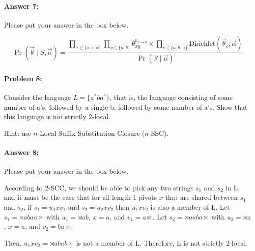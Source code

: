\documentclass[10pt]{article}
\newenvironment{AnswerBox}{\begin{mdframed}[style=simple]}{\end{mdframed}}
\begin{document}
\paragraph{Answer 7:}  Please put your answer in the box below.


\begin{AnswerBox}%

    \[\Pr(\vec{\theta} \mid S, \vec{\alpha}) = \frac{\prod_{x \in \{a, b, \rtimes\}} \prod_{y \in \{a, b\}} \theta_{xy}^{n_{x \rightarrow y}} \times \prod_{c \in \{a, b, \rtimes\}} \mathrm{Dirichlet}(\vec{\theta}_c; \vec{\alpha})}{\Pr(S \mid \vec{\alpha})}\]


    
\end{AnswerBox}%



\hrulefill %

\paragraph{Problem 8:}

Consider the language $L=\{a^* b a^*\}$, that is, the language
consisting of some number of a's, followed by a single b, followed by
some number of a's. Show that this language is not strictly
$2$-local.

 Hint: use $n$-Local Suffix Substitution Closure ($n$-SSC).

\paragraph{Answer 8:} Please put your answer in the box below.


\begin{AnswerBox}%

    According to 2-SCC, we should be able to pick any two strings $s_1$ and $s_2$ in L, and it must be the case that for all length 1 pivots $x$ that are shared between $s_1$ and $s_2$, if $s_1=u_1xv_1$ and $s_2=u_2xv_2$ then $u_1xv_2$ is also a member of L.
    Let $s_1 = \rtimes abaa \ltimes$ with $u_1 = \rtimes ab$, $x = a$, and $v_1 = a\ltimes$.
    Let $s_2 = \rtimes aaba \ltimes$ with $u_2 = \rtimes a$, $x = a$, and $v_2 = ba\ltimes$. 
    
    Then, $u_1xv_2 = \rtimes abab \ltimes$ is not a member of L. Therefore, L is not strictly 2-local.

    
\end{AnswerBox}%
\end{document}
